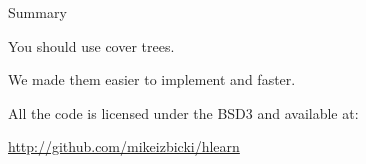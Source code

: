 \documentclass{beamer}
\theoremstyle{nameddefinition}
\newcommand\+{\op}
\begin{document}


















\begin{frame}{Summary}

\Large

You should use cover trees.

\vspace{0.35in}
We made them easier to implement and faster.

\vspace{0.35in}

All the code is licensed under the BSD3 and available at:

\begin{center}
\url{http://github.com/mikeizbicki/hlearn}
\end{center}


\end{frame}

\end{document}
